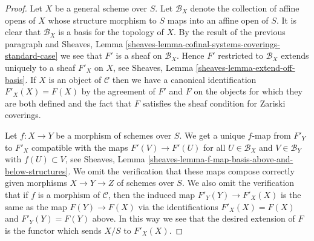 \begin{proof}
\medskip\noindent
Let $X$ be a general scheme over $S$. Let $\mathcal{B}_X$ denote
the collection of affine opens of $X$ whose structure morphism
to $S$ maps into an affine open of $S$. It is clear that
$\mathcal{B}_X$ is a basis for the topology of $X$.
By the result of the previous paragraph and Sheaves, Lemma
\ref{sheaves-lemma-cofinal-systems-coverings-standard-case}
we see that $F'$ is a sheaf on $\mathcal{B}_X$.
Hence $F'$ restricted to $\mathcal{B}_X$
extends uniquely to a sheaf $F'_X$ on $X$, see
Sheaves, Lemma \ref{sheaves-lemma-extend-off-basis}.
If $X$ is an object of $\mathcal{C}$ then we have a canonical
identification $F'_X(X) = F(X)$ by the agreement of $F'$ and $F$
on the objects for which they are both defined and
the fact that $F$ satisfies the sheaf condition for
Zariski coverings.

\medskip\noindent
Let $f : X \to Y$ be a morphism of schemes over $S$.
We get a unique $f$-map from $F'_Y$ to $F'_X$ compatible
with the maps $F'(V) \to F'(U)$ for all
$U \in \mathcal{B}_X$ and $V \in \mathcal{B}_Y$
with $f(U) \subset V$, see
Sheaves, Lemma \ref{sheaves-lemma-f-map-basis-above-and-below-structures}.
We omit the verification that these maps compose
correctly given morphisms $X \to Y \to Z$ of schemes over $S$.
We also omit the verification that if $f$ is a morphism
of $\mathcal{C}$, then the induced map $F'_Y(Y) \to F'_X(X)$
is the same as the map $F(Y) \to F(X)$ via the identifications
$F'_X(X) = F(X)$ and $F'_Y(Y) = F(Y)$ above.
In this way we see that the desired extension of
$F$ is the functor which sends $X/S$ to $F'_X(X)$.


\end{proof}

